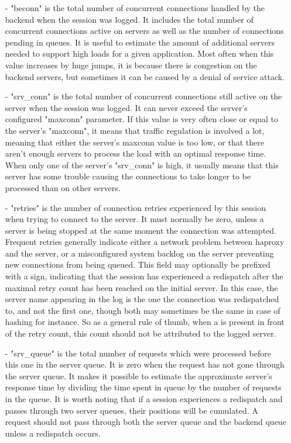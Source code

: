 \begin{itemize}
\item[-]
    "beconn" is the total number of concurrent connections handled by the
    backend when the session was logged. It includes the total number of
    concurrent connections active on servers as well as the number of
    connections pending in queues. It is useful to estimate the amount of
    additional servers needed to support high loads for a given application.
    Most often when this value increases by huge jumps, it is because there is
    congestion on the backend servers, but sometimes it can be caused by a
    denial of service attack.

\item[-]
    "srv\_conn" is the total number of concurrent connections still active on
    the server when the session was logged. It can never exceed the server's
    configured "maxconn" parameter. If this value is very often close or equal
    to the server's "maxconn", it means that traffic regulation is involved a
    lot, meaning that either the server's maxconn value is too low, or that
    there aren't enough servers to process the load with an optimal response
    time. When only one of the server's "srv\_conn" is high, it usually means
    that this server has some trouble causing the connections to take longer to
    be processed than on other servers.

\item[-]
    "retries" is the number of connection retries experienced by this session
    when trying to connect to the server. It must normally be zero, unless a
    server is being stopped at the same moment the connection was attempted.
    Frequent retries generally indicate either a network problem between
    haproxy and the server, or a misconfigured system backlog on the server
    preventing new connections from being queued. This field may optionally be
    prefixed with a \chr{+} sign, indicating that the session has experienced a
    redispatch after the maximal retry count has been reached on the initial
    server. In this case, the server name appearing in the log is the one the
    connection was redispatched to, and not the first one, though both may
    sometimes be the same in case of hashing for instance. So as a general rule
    of thumb, when a \chr{+} is present in front of the retry count, this count
    should not be attributed to the logged server.

\item[-]
    "srv\_queue" is the total number of requests which were processed before
    this one in the server queue. It is zero when the request has not gone
    through the server queue. It makes it possible to estimate the approximate
    server's response time by dividing the time spent in queue by the number of
    requests in the queue. It is worth noting that if a session experiences a
    redispatch and passes through two server queues, their positions will be
    cumulated. A request should not pass through both the server queue and the
    backend queue unless a redispatch occurs.


\end{itemize}
